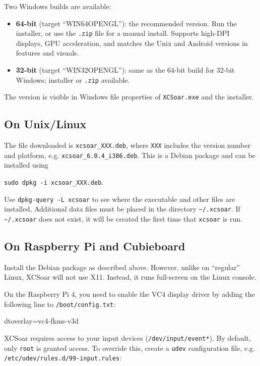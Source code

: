 Two Windows builds are available:
\begin{itemize}
\item \textbf{64-bit} (target ``WIN64OPENGL''): the recommended
  version. Run the installer, or use the \verb|.zip| file for a manual
  install. Supports high-DPI displays, GPU acceleration, and matches the
  Unix and Android versions in features and visuals.
\item \textbf{32-bit} (target ``WIN32OPENGL''): same as the 64-bit
  build for 32-bit Windows; installer or \verb|.zip| available.
\end{itemize}

The version is visible in Windows file properties of
\texttt{XCSoar.exe} and the installer.

\subsection*{On Unix/Linux}

The file downloaded is \verb|xcsoar_XXX.deb|, where \verb|XXX| includes
the version number and platform, e.g. \verb|xcsoar_6.0.4_i386.deb|.
This is a Debian package and can be installed using
\begin{center}
\verb|sudo dpkg -i xcsoar_XXX.deb|.
\end{center}
Use \verb|dpkg-query -L xcsoar| to see where the executable and 
other files are installed,
Additional data files must be placed in the directory
\verb|~/.xcsoar|.
If \verb|~/.xcsoar| does not exist, it will be created the first time
that \verb|xcsoar| is run.

\subsection*{On Raspberry Pi and Cubieboard}

Install the Debian package as described above.  However, unlike on
``regular'' Linux, XCSoar will not use X11.  Instead, it runs
full-screen on the Linux console.

On the Raspberry Pi 4, you need to enable the VC4 display driver by
adding the following line to \texttt{/boot/config.txt}:

\begin{verbatim*}
dtoverlay=vc4-fkms-v3d
\end{verbatim*}

XCSoar requires access to your input devices
(\texttt{/dev/input/event*}).  By default, only \texttt{root} is
granted access.  To override this, create a \texttt{udev}
configuration file, e.g. \texttt{/etc/udev/rules.d/99-input.rules}:

